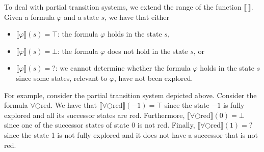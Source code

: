\documentclass[12pt]{article}
\newcommand{\nxt}{\bigcirc}
\theoremstyle{definition}
\newcommand{\satisfaction}[1]{\llbracket #1 \rrbracket}
\newcommand{\bottom}{\mathord{\perp}}
\begin{document}
To deal with partial transition systems, we extend the range of the function $\satisfaction{\ }$.  Given a formula $\varphi$ and a state $s$, we have that either
\begin{itemize}
\item 
$\satisfaction{\varphi}(s) = \top$: the formula $\varphi$ holds in the state $s$,
\item
$\satisfaction{\varphi}(s) = \bottom$: the formula $\varphi$ does not hold in the state $s$, or
\item
$\satisfaction{\varphi}(s) = \mathord{?}$: we cannot determine whether the formula $\varphi$ holds in the state $s$ since some states, relevant to $\varphi$,  have not been explored.
\end{itemize}

For example, consider the partial transition system depicted above.  Consider the formula $\forall \nxt \mbox{red}$.  We have that $\satisfaction{\forall \nxt \mbox{red}}(-1) = \top$ since the state $-1$ is fully explored and all its successor states are red.  Furthermore, $\satisfaction{\forall \nxt \mbox{red}}(0) = \bottom$ since one of the  successor states of state 0 is not red.  Finally, $\satisfaction{\forall \nxt \mbox{red}}(1) = \mathord{?}$ since the state 1 is not fully explored and it does not have a successor that is not red.
\end{document}
